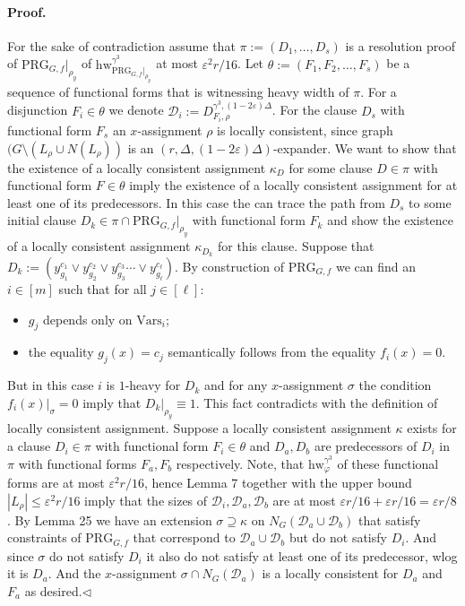 \paragraph{Proof.} For the sake of contradiction assume that $\pi:=(D_1,\ldots,D_s)$ is a resolution proof of $\mathrm{PRG}_{G,f}|_{\rho_y}$ of $\mathrm{hw}_{\mathrm{PRG}_{G,f}|_{\rho_y}}^{\gamma^3}$ at most $\varepsilon^2r/16$. Let $\theta:=(F_1,F_2,\ldots,F_s)$ be a sequence of functional forms that is witnessing heavy width of $\pi$. For a disjunction $F_i\in\theta$ we denote $\mathcal D_i:=D_{F_i,\rho}^{\gamma^3,(1-2\varepsilon)\Delta}$.
For the clause $D_s$ with functional form $F_s$ an $x$-assignment $\rho$ is locally consistent, since graph $(G\setminus(L_\rho\cup N(L_\rho))$ is an $(r,\Delta,(1-2\varepsilon)\Delta)$-expander. We want to show that the existence of a locally consistent assignment $\kappa_D$ for some clause $D\in\pi$ with functional form $F\in\theta$ imply the existence of a locally consistent assignment for at least one of its predecessors. In this case the can trace the path from $D_s$ to some initial clause $D_k\in\pi\cap\mathrm{PRG}_{G,f}|_{\rho_y}$ with functional form $F_k$ and show the existence of a locally consistent assignment $\kappa_{D_k}$ for this clause.
Suppose that $D_k:=(y_{g_1}^{c_1}\vee y_{g_2}^{c_2}\vee y_{g_3}^{c_3}\cdots\vee y_{g_\ell}^{c_\ell})$. By construction of $\mathrm{PRG}_{G,f}$ we can find an $i\in[m]$ such that for all $j\in[\ell]$:
\begin{itemize}
\item $g_j$ depends only on $\mathrm{Vars}_i$;
\item the equality $g_j(x)=c_j$ semantically follows from the equality $f_i(x)=0$.
\end{itemize}
But in this case $i$ is $1$-heavy for $D_k$ and for any $x$-assignment $\sigma$ the condition $f_i(x)|_\sigma=0$ imply that $D_k|_{\rho_y}\equiv1$. This fact contradicts with the definition of locally consistent assignment.
Suppose a locally consistent assignment $\kappa$ exists for a clause $D_i\in\pi$ with functional form $F_i\in\theta$ and $D_a,D_b$ are predecessors of $D_i$ in $\pi$ with functional forms $F_a,F_b$ respectively. Note, that $\mathrm{hw}_{\varphi}^{\gamma^3}$ of these functional forms are at most $\varepsilon^2r/16$, hence Lemma 7 together with the upper bound $|L_\rho|\leq\varepsilon^2r/16$ imply that the sizes of $\mathcal D_i,\mathcal D_a,\mathcal D_b$ are at most $\varepsilon r/16+\varepsilon r/16=\varepsilon r/8$. By Lemma 25 we have an extension $\sigma\supseteq\kappa$ on $N_G(\mathcal D_a\cup\mathcal D_b)$ that satisfy constraints of $\mathrm{PRG}_{G,f}$ that correspond to $\mathcal D_a\cup\mathcal D_b$ but do not satisfy $D_i$. And since $\sigma$ do not satisfy $D_i$ it also do not satisfy at least one of its predecessor, wlog it is $D_a$. And the $x$-assignment $\sigma\cap N_G(\mathcal D_a)$ is a locally consistent for $D_a$ and $F_a$ as desired.\hfill$\triangleleft$
